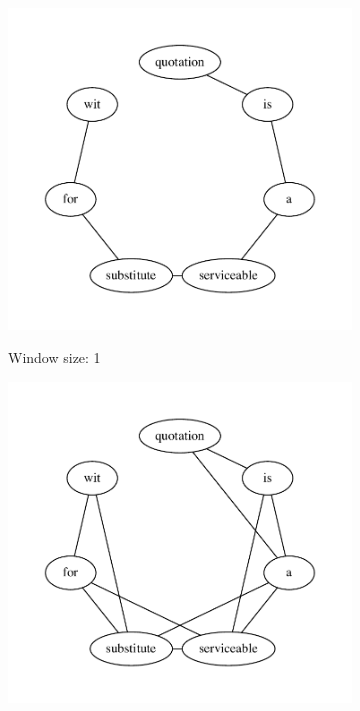 \begin{figure}[htb!]%
    \centering
    \begin{subfigure}[t]{0.33\linewidth}{\includegraphics[width=\linewidth]{assets/figures/cooccurrence/window_size_1.pdf}}%
    \caption{Window size: 1}%
    \end{subfigure}
    \begin{subfigure}[t]{0.33\linewidth}{\includegraphics[width=\linewidth]{assets/figures/cooccurrence/window_size_2.pdf}}%

\end{subfigure}
\end{figure}
